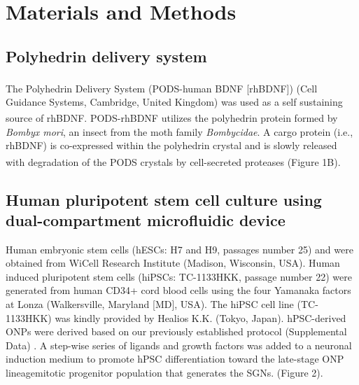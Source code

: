 \documentclass[review]{elsarticle}
\begin{document}
\section{Materials and Methods}
\subsection{Polyhedrin delivery system}
The Polyhedrin Delivery System (PODS\textsuperscript{\textregistered}-human BDNF [rhBDNF]) (Cell Guidance Systems, Cambridge, United Kingdom) was used as a self sustaining source of rhBDNF. PODS\textsuperscript{\textregistered}-rhBDNF utilizes the polyhedrin protein formed by \textit{Bombyx mori}, an insect from the moth family \textit{Bombycidae}. A cargo protein (i.e., rhBDNF) is co-expressed within the polyhedrin crystal and is slowly released with degradation of the PODS\textsuperscript{\textregistered} crystals by cell-secreted proteases (Figure 1B)\cite{Chang2020, Suzuki1997, Guo2017}. 

\subsection{Human pluripotent stem cell culture using dual-compartment microfluidic device}
Human embryonic stem cells (hESCs: H7 and H9, passages number 25) and were obtained from WiCell Research Institute (Madison, Wisconsin, USA). Human induced pluripotent stem cells (hiPSCs:  TC-1133HKK, passage number 22) were generated from human CD34+ cord blood cells using the four Yamanaka factors at Lonza (Walkersville, Maryland [MD], USA). The hiPSC cell line (TC-1133HKK) was kindly provided by Healios K.K. (Tokyo, Japan). hPSC-derived ONPs were derived based on our previously established protocol (Supplemental Data) \cite{Heuer2021,Chang2020, Matsuoka2017g, Matsuoka2017}. A step-wise series of ligands and growth factors was added to a neuronal induction medium to promote hPSC differentiation toward the late-stage ONP lineage\textemdash mitotic progenitor population that generates the SGNs. (Figure 2).
\end{document}
